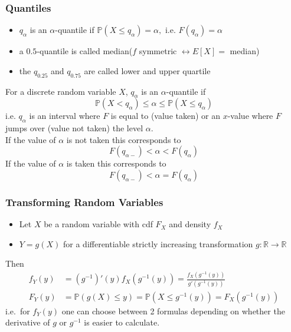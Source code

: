 \subsubsection{Quantiles}
\begin{itemize}
    \item $q_\alpha$ is an $\alpha$-quantile if $\mathbb{P}(X\leq q_\alpha)=\alpha,\text{ i.e. }F(q_\alpha)=\alpha$
    \item a $0.5$-quantile is called median\newline ($f$ symmetric $\leftrightarrow E[X]=$ median)
    \item the $q_{0.25}$ and $q_{0.75}$ are called lower and upper quartile
\end{itemize}

For a discrete random variable $X$, $q_\alpha$ is an $\alpha$-quantile if
\begin{equation*}
    \mathbb{P}(X<q_\alpha)\le\alpha\le\mathbb{P}(X\le q_\alpha)
\end{equation*}
i.e. $q_\alpha$ is an interval where $F$ is equal to (value taken) or an $x$-value where $F$ jumps over (value not taken) the level $\alpha$.\\
If the value of $\alpha$ is not taken this corresponds to
\begin{equation*}
    F(q_{\alpha-})< \alpha < F(q_{\alpha})
\end{equation*}
If the value of $\alpha$ is taken this corresponds to
\begin{equation*}
    F(q_{\alpha-})< \alpha = F(q_{\alpha})
\end{equation*}

\subsubsection{Transforming Random Variables}
\begin{itemize}
    \item Let $X$ be a random variable with cdf $F_X$ and density $f_X$
    \item $Y=g(X)$ for a differentiable strictly increasing transformation $g:\mathbb{R}\to\mathbb{R}$
\end{itemize}
Then
\begin{align*}
    f_Y(y)   & =(g^{-1})'(y)f_X(g^{-1}(y))=\frac{f_X(g^{-1}(y))}{g'(g^{-1}(y))}     \\
    F_{Y}(y) & =\mathbb{P}(g(X)\leq y)=\mathbb{P}(X\leq g^{-1}(y))=F_{X}(g^{-1}(y))
\end{align*}
i.e.\ for $f_Y(y)$ one can choose between 2 formulas depending on whether the derivative of $g$ or $g^{-1}$ is easier to calculate.

